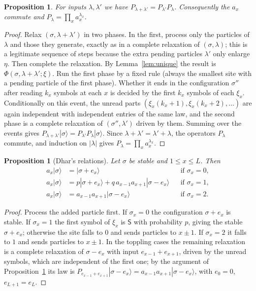 \documentclass[11pt]{amsart}
\newtheorem{proposition}[theorem]{Proposition}
\theoremstyle{definition}
\theoremstyle{remark}
\newcommand{\ket}[1]{|#1\rangle}
\begin{document}
\begin{proposition}\label{prop:compose}
For inputs $\lambda,\lambda'$ we have $P_{\lambda+\lambda'}=P_{\lambda'}P_\lambda$. Consequently the $a_x$ commute and $P_\lambda=\prod_x a_x^{\lambda_x}$.
\end{proposition}

\begin{proof}
Relax $(\sigma,\lambda+\lambda')$ in two phases. In the first, process only the particles of $\lambda$ and those they generate, exactly as in a complete relaxation of $(\sigma,\lambda)$; this is a legitimate sequence of steps because the extra pending particles $\lambda'$ only enlarge $\eta$. Then complete the relaxation. By Lemma~\ref{lem:unique} the result is $\Phi(\sigma,\lambda+\lambda';\xi)$. Run the first phase by a fixed rule (always the smallest site with a pending particle of the first phase). Whether it ends in the configuration $\sigma''$ after reading $k_x$ symbols at each $x$ is decided by the first $k_x$ symbols of each $\xi_x$. Conditionally on this event, the unread parts $(\xi_x(k_x+1),\xi_x(k_x+2),\dots)$ are again independent with independent entries of the same law, and the second phase is a complete relaxation of $(\sigma'',\lambda')$ driven by them. Summing over the events gives $P_{\lambda+\lambda'}\ket\sigma=P_{\lambda'}P_\lambda\ket\sigma$. Since $\lambda+\lambda'=\lambda'+\lambda$, the operators $P_\lambda$ commute, and induction on $|\lambda|$ gives $P_\lambda=\prod_xa_x^{\lambda_x}$.
\end{proof}

\begin{proposition}[Dhar's relations]\label{prop:relations}
Let $\sigma$ be stable and $1\le x\le L$. Then
\begin{align}
a_x\ket{\sigma}&=\ket{\sigma+e_x} &&\text{if }\sigma_x=0, \tag{R0}\label{R0}\\
a_x\ket{\sigma}&=p\ket{\sigma+e_x}+q\,a_{x-1}a_{x+1}\ket{\sigma-e_x} &&\text{if }\sigma_x=1, \tag{R1}\label{R1}\\
a_x\ket{\sigma}&=a_{x-1}a_{x+1}\ket{\sigma-e_x} &&\text{if }\sigma_x=2. \tag{R2}\label{R2}
\end{align}
\end{proposition}

\begin{proof}
Process the added particle first. If $\sigma_x=0$ the configuration $\sigma+e_x$ is stable. If $\sigma_x=1$ the first symbol of $\xi_x$ is $\mathsf S$ with probability $p$, giving the stable $\sigma+e_x$; otherwise the site falls to $0$ and sends particles to $x\pm1$. If $\sigma_x=2$ it falls to $1$ and sends particles to $x\pm1$. In the toppling cases the remaining relaxation is a complete relaxation of $\sigma-e_x$ with input $e_{x-1}+e_{x+1}$, driven by the unread symbols, which are independent of the first one; by the argument of Proposition~\ref{prop:compose} its law is $P_{e_{x-1}+e_{x+1}}\ket{\sigma-e_x}=a_{x-1}a_{x+1}\ket{\sigma-e_x}$, with $e_0=0$, $e_{L+1}=e_L$.
\end{proof}
\end{document}
